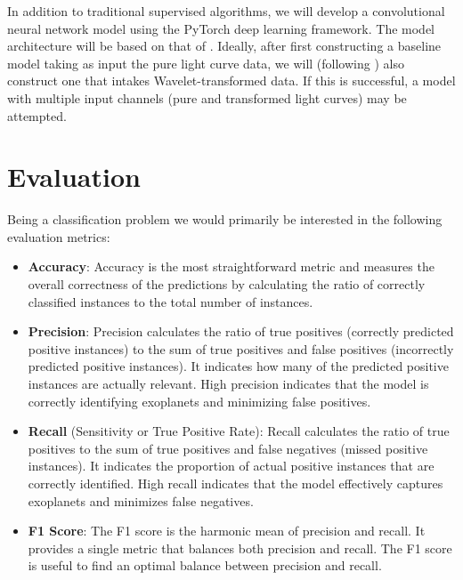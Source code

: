 \documentclass{article}
\begin{document}
In addition to traditional supervised algorithms, we will develop a convolutional neural network model using the PyTorch deep learning framework. The model architecture will be based on that of \cite{Pearson2018}. Ideally, after first constructing a baseline model taking as input the pure light curve data, we will (following \citealp{Pearson2018}) also construct one that intakes Wavelet-transformed data. If this is successful, a model with multiple input channels (pure and transformed light curves) may be attempted. 

\section{Evaluation}
\label{Evaluation}

Being a classification problem we would primarily be interested in the following evaluation metrics: 
\begin{itemize}
\item \textbf{Accuracy}: Accuracy is the most straightforward metric and measures the overall correctness of the predictions by calculating the ratio of correctly classified instances to the total number of instances.
\item \textbf{Precision}: Precision calculates the ratio of true positives (correctly predicted positive instances) to the sum of true positives and false positives (incorrectly predicted positive instances). It indicates how many of the predicted positive instances are actually relevant. High precision indicates that the model is correctly identifying exoplanets and minimizing false positives.
\item \textbf{Recall} (Sensitivity or True Positive Rate): Recall calculates the ratio of true positives to the sum of true positives and false negatives (missed positive instances). It indicates the proportion of actual positive instances that are correctly identified. High recall indicates that the model effectively captures exoplanets and minimizes false negatives.
\item \textbf{F1 Score}: The F1 score is the harmonic mean of precision and recall. It provides a single metric that balances both precision and recall. The F1 score is useful to find an optimal balance between precision and recall.
\end{itemize}
\end{document}
